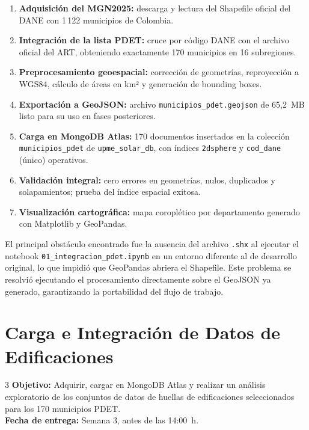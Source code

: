 \documentclass[12pt, a4paper]{report}
\begin{document}
\begin{enumerate}[label=\textbf{\arabic*.}]
  \item \textbf{Adquisición del MGN2025:} descarga y lectura del Shapefile
        oficial del DANE con 1\,122 municipios de Colombia.
  \item \textbf{Integración de la lista PDET:} cruce por código DANE con el
        archivo oficial del ART, obteniendo exactamente 170 municipios en
        16 subregiones.
  \item \textbf{Preprocesamiento geoespacial:} corrección de geometrías,
        reproyección a WGS84, cálculo de áreas en km² y generación de
        bounding boxes.
  \item \textbf{Exportación a GeoJSON:} archivo \texttt{municipios\_pdet.geojson}
        de 65{,}2~MB listo para su uso en fases posteriores.
  \item \textbf{Carga en MongoDB Atlas:} 170 documentos insertados en la
        colección \texttt{municipios\_pdet} de \texttt{upme\_solar\_db},
        con índices \texttt{2dsphere} y \texttt{cod\_dane} (único) operativos.
  \item \textbf{Validación integral:} cero errores en geometrías, nulos,
        duplicados y solapamientos; prueba del índice espacial exitosa.
  \item \textbf{Visualización cartográfica:} mapa coroplético por departamento
        generado con Matplotlib y GeoPandas.
\end{enumerate}

El principal obstáculo encontrado fue la ausencia del archivo
\texttt{.shx} al ejecutar el notebook \texttt{01\_integracion\_pdet.ipynb}
en un entorno diferente al de desarrollo original, lo que impidió que
GeoPandas abriera el Shapefile. Este problema se resolvió ejecutando el
procesamiento directamente sobre el GeoJSON ya generado, garantizando la
portabilidad del flujo de trabajo.

\chapter{Carga e Integración de Datos de Edificaciones}
\label{cap:entrega3}

\begin{semanabox}[Entrega 3]{3}
  \textbf{Objetivo:} Adquirir, cargar en MongoDB Atlas y realizar un
  análisis exploratorio de los conjuntos de datos de huellas de
  edificaciones seleccionados para los 170 municipios PDET.\\
  \textbf{Fecha de entrega:} Semana 3, antes de las 14:00~h.
\end{semanabox}
\end{document}

